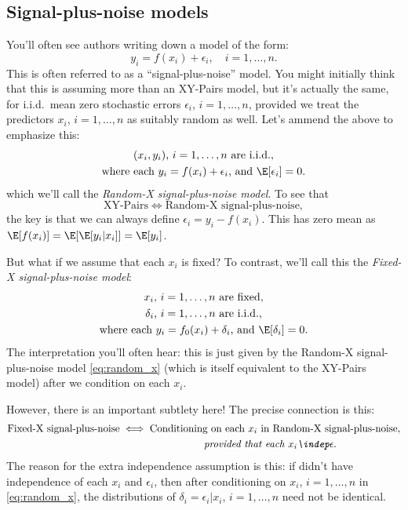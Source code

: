 \documentclass{article}
\begin{document}
\subsection{Signal-plus-noise models}

You'll often see authors writing down a model of the form:   
\[
y_i = f(x_i) + \epsilon_i, \quad i=1,\dots,n.
\]
This is often referred to as a ``signal-plus-noise'' model. You might initially
think that this is assuming more than an XY-Pairs model, but it's actually the
same, for i.i.d.\ mean zero stochastic errors $\epsilon_i$, $i=1,\dots,n$,
provided we treat the predictors $x_i$, $i=1,\dots,n$ as suitably random as 
well. Let's ammend the above to emphasize this:   
\begin{equation}
\begin{gathered}
\label{eq:random_x}
\text{$(x_i, y_i)$, $i=1,\dots,n$ are i.i.d.}, \\
\text{where each $y_i = f(x_i) + \epsilon_i$, and $\E[\epsilon_i] = 0$}. 
\end{gathered}
\end{equation}
which we'll call the \emph{Random-X signal-plus-noise model}. To see that 
\[
\text{XY-Pairs} \iff \text{Random-X signal-plus-noise},
\]
the key is that we can always define $\epsilon_i = y_i - f(x_i)$. This has zero
mean as $\E[f(x_i)] = \E[\E[y_i|x_i]] = \E[y_i]$.   

But what if we assume that each $x_i$ is fixed? To contrast, we'll call this the
\emph{Fixed-X signal-plus-noise model}: 
\begin{equation}
\begin{gathered}
\label{eq:fixed_x}
\text{$x_i$, $i=1,\dots,n$ are fixed}, \\
\text{$\delta_i$, $i=1,\dots,n$ are i.i.d.}, \\
\text{where each $y_i = f_0(x_i) + \delta_i$, and $\E[\delta_i] = 0$}. 
\end{gathered}
\end{equation}
The interpretation you'll often hear: this is just given by the Random-X 
signal-plus-noise model \eqref{eq:random_x} (which is itself equivalent to the
XY-Pairs model) after we condition on each $x_i$.          

However, there is an important subtlety here! The precise connection is this: 
\begin{gather*}
\text{Fixed-X signal-plus-noise} \iff \text{Conditioning on each $x_i$ in 
  Random-X signal-plus-noise}, \\ 
\hspace{130pt} \text{\emph{provided that each $x_i \indep \epsilon$}}.   
\end{gather*}
The reason for the extra independence assumption is this: if didn't have
independence of each $x_i$ and $\epsilon_i$, then after conditioning on $x_i$,
$i=1,\dots,n$ in \eqref{eq:random_x}, the distributions of $\delta_i =
\epsilon_i | x_i$, $i=1,\dots,n$ need not be identical.  
\end{document}
